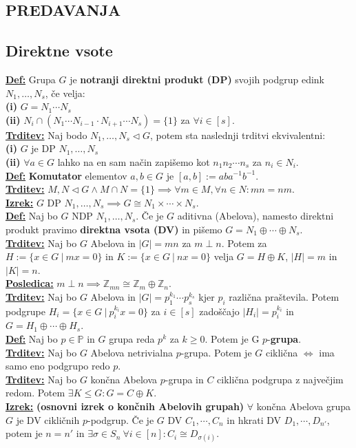\documentclass[a4paper,oneside,8pt,landscape]{extarticle}
\title{\Title}
\author{\Author}
\date{\today}
\let\oldtextbf\textbf
\renewcommand{\textbf}[1]{\oldtextbf{\boldmath #1}}
\newcommand{\definicija}[1]{\textbf{\underline{Def:} }{#1}\\}
\newcommand{\trditev}[1]{\textbf{\underline{Trditev:} }{#1}\\}
\newcommand{\posledica}[1]{\textbf{\underline{Posledica:} }{#1}\\}
\newcommand{\izrek}[1]{\textbf{\underline{Izrek:} }{#1}\\}
\newcommand{\bt}[1]{\textbf{#1}}
\begin{document}
\begin{multicols*}{3}
\section*{PREDAVANJA}
\subsection*{Direktne vsote}
\definicija{Grupa $G$ je \bt{notranji direktni produkt (DP)} svojih podgrup edink $N_1,\dots,N_s$, če velja: \\
\bt{(i)} $G=N_1\cdots N_s$ \\
\bt{(ii)} $N_i \cap (N_1\cdots N_{i-1}\cdot N_{i+1}\cdots N_s)=\{1\}$ za $\forall i\in[s]$.}
\trditev{Naj bodo $N_1,\dots,N_s \triangleleft G$, potem sta naslednji trditvi ekvivalentni: \\
\bt{(i)} $G$ je DP $N_1, \dots,N_s$ \\
\bt{(ii)} $\forall a\in G$ lahko na en sam način zapišemo kot $n_1n_2\cdots n_s$ za $n_i\in N_i$.}
\definicija{\bt{Komutator} elementov $a,b\in G$ je $[a,b]:=aba^{-1}b^{-1}$.}
\trditev{$M,N\triangleleft G \land M\cap N = \{1\} \implies \forall m\in M,\forall n\in N:mn = nm$.}
\izrek{$G$ DP $N_1,\dots,N_s \implies G \cong N_1\times \cdots \times N_s$. }
\definicija{Naj bo $G$ NDP $N_1,\dots,N_s$. Če je $G$ aditivna (Abelova), namesto direktni produkt pravimo \bt{direktna vsota (DV)} in pišemo $G = N_1 \oplus \cdots \oplus N_s$. }
\trditev{Naj bo $G$ Abelova in $|G| = mn$ za $m\perp n$. Potem za $H:=\{x\in G \ | \ mx=0\}$ in $K:= \{x\in G \ | \ nx = 0\}$ velja $G=H\oplus K$, $|H|=m$ in $|K| = n$.}
\posledica{$m\perp n\implies \mathbb{Z}_{mn} \cong \mathbb{Z}_m \oplus \mathbb{Z}_n$.}
\trditev{Naj bo $G$ Abelova in $|G| = p_1^{k_1}\cdots p_s^{k_s}$ kjer $p_i$ različna praštevila. Potem podgrupe $H_i = \{x\in G \ | \ p_i^{k_i}x = 0\}$ za $i\in [s]$ zadoščajo $|H_i| = p_i^{k_i}$ in $G=H_1\oplus\cdots \oplus H_s$.}
\definicija{Naj bo $p\in \mathbb{P}$ in $G$ grupa reda $p^k$ za $k\geq 0$. Potem je G $p$-\bt{grupa}.}
\trditev{Naj bo $G$ Abelova netrivialna $p$-grupa. Potem je $G$ ciklična $\iff$ ima samo eno podgrupo redo $p$.}
\trditev{Naj bo $G$ končna Abelova $p$-grupa in $C$ ciklična podgrupa z največjim redom. Potem $\exists K\leq G: G = C \oplus K$.}
\izrek{\bt{(osnovni izrek o končnih Abelovih grupah)} $\forall$ končna Abelova grupa $G$ je DV cikličnih $p$-podgrup. Če je $G$ DV $C_1,\cdots,C_n$ in hkrati DV $D_1,\cdots,D_{n'}$, potem je $n=n'$ in $\exists \sigma \in S_n \ \forall i\in [n]: C_i \cong D_{\sigma(i)}.$}

\end{multicols*}
\end{document}

